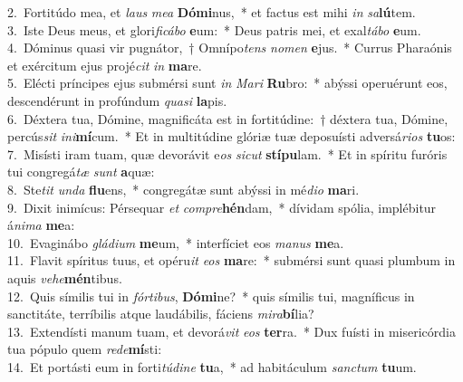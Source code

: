 {2.~}Fortitúdo mea, et \textit{laus} \textit{me}\textit{a} \textbf{Dó}\textbf{mi}nus,~* et factus est mihi \textit{in} \textit{sa}\textbf{lú}tem.\\
{3.~}Iste Deus meus, et glori\textit{fi}\textit{cá}\textit{bo} \textbf{e}um:~* Deus patris mei, et exal\textit{tá}\textit{bo} \textbf{e}um.\\
{4.~}Dóminus quasi vir pugnátor,~† Omnípo\textit{tens} \textit{no}\textit{men} \textbf{e}jus.~* Currus Pharaónis et exércitum ejus projé\textit{cit} \textit{in} \textbf{ma}re.\\
{5.~}Elécti príncipes ejus submérsi sunt \textit{in} \textit{Ma}\textit{ri} \textbf{Ru}bro:~* abýssi operuérunt eos, descendérunt in profúndum \textit{qua}\textit{si} \textbf{la}pis.\\
{6.~}Déxtera tua, Dómine, magnificáta est in fortitúdine:~† déxtera tua, Dómine, percús\textit{sit} \textit{i}\textit{ni}\textbf{mí}cum.~* Et in multitúdine glóriæ tuæ deposuísti adversá\textit{ri}\textit{os} \textbf{tu}os:\\
{7.~}Misísti iram tuam, quæ devorávit e\textit{os} \textit{si}\textit{cut} \textbf{stí}\textbf{pu}lam.~* Et in spíritu furóris tui congregá\textit{tæ} \textit{sunt} \textbf{a}quæ:\\
{8.~}Ste\textit{tit} \textit{un}\textit{da} \textbf{flu}ens,~* congregátæ sunt abýssi in mé\textit{di}\textit{o} \textbf{ma}ri.\\
{9.~}Dixit inimícus: Pérsequar \textit{et} \textit{com}\textit{pre}\textbf{hén}dam,~* dívidam spólia, implébitur á\textit{ni}\textit{ma} \textbf{me}a:\\
{10.~}Evaginábo \textit{glá}\textit{di}\textit{um} \textbf{me}um,~* interfíciet eos \textit{ma}\textit{nus} \textbf{me}a.\\
{11.~}Flavit spíritus tuus, et opéru\textit{it} \textit{e}\textit{os} \textbf{ma}re:~* submérsi sunt quasi plumbum in aquis \textit{ve}\textit{he}\textbf{mén}tibus.\\
{12.~}Quis símilis tui in \textit{fór}\textit{ti}\textit{bus}, \textbf{Dó}\textbf{mi}ne?~* quis símilis tui, magníficus in sanctitáte, terríbilis atque laudábilis, fáciens \textit{mi}\textit{ra}\textbf{bí}lia?\\
{13.~}Extendísti manum tuam, et devorá\textit{vit} \textit{e}\textit{os} \textbf{ter}ra.~* Dux fuísti in misericórdia tua pópulo quem \textit{re}\textit{de}\textbf{mí}sti:\\
{14.~}Et portásti eum in forti\textit{tú}\textit{di}\textit{ne} \textbf{tu}a,~* ad habitáculum \textit{san}\textit{ctum} \textbf{tu}um.\\
